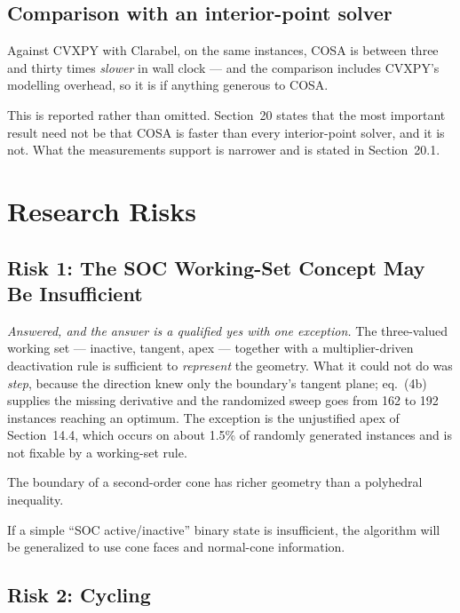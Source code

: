 \documentclass[11pt,a4paper]{article}
\begin{document}
\subsection{Comparison with an interior-point solver}

Against CVXPY with Clarabel, on the same instances, COSA is between
three and thirty times \emph{slower} in wall clock --- and the
comparison includes CVXPY's modelling overhead, so it is if anything
generous to COSA.

This is reported rather than omitted. Section~20 states that the most
important result need not be that COSA is faster than every
interior-point solver, and it is not. What the measurements support is
narrower and is stated in Section~20.1.

\section{Research Risks}

\subsection{Risk 1: The SOC Working-Set Concept May Be Insufficient}

\emph{Answered, and the answer is a qualified yes with one exception.}
The three-valued working set --- inactive, tangent, apex --- together
with a multiplier-driven deactivation rule is sufficient to
\emph{represent} the geometry. What it could not do was \emph{step},
because the direction knew only the boundary's tangent plane; eq.~(4b)
supplies the missing derivative and the randomized sweep goes from 162
to 192 instances reaching an optimum. The exception is the unjustified
apex of Section~14.4, which occurs on about 1.5\% of randomly
generated instances and is not fixable by a working-set rule.

The boundary of a second-order cone has richer geometry than a
polyhedral inequality.

If a simple ``SOC active/inactive'' binary state is insufficient, the
algorithm will be generalized to use cone faces and normal-cone
information.

\subsection{Risk 2: Cycling}
\end{document}
